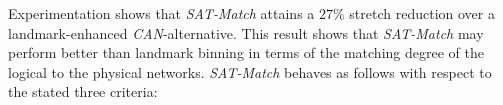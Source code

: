 Experimentation shows that \emph{SAT-Match} 
attains a $27\%$ stretch reduction over 
a landmark-enhanced \emph{CAN}-alternative.
This result shows that \emph{SAT-Match} 
may perform better than landmark binning in terms of the matching degree
of the logical to the physical networks.
\emph{SAT-Match} behaves as follows with respect to the stated three criteria:
%
%
%
%
